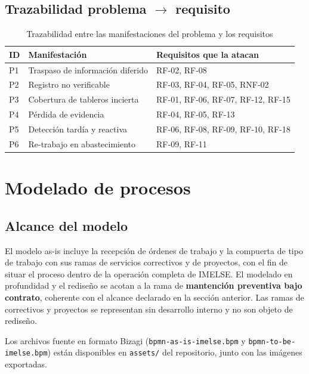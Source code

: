 \documentclass[10pt,letterpaper]{article}
\begin{document}
\subsection{Trazabilidad problema $\rightarrow$ requisito}

\begin{table}[H]
\centering
\small
\begin{tabular}{@{}p{1.2cm}p{6.3cm}p{6.8cm}@{}}
\toprule
\textbf{ID} & \textbf{Manifestación} & \textbf{Requisitos que la atacan} \\
\midrule
P1 & Traspaso de información diferido & RF-02, RF-08 \\
P2 & Registro no verificable & RF-03, RF-04, RF-05, RNF-02 \\
P3 & Cobertura de tableros incierta & RF-01, RF-06, RF-07, RF-12, RF-15 \\
P4 & Pérdida de evidencia & RF-04, RF-05, RF-13 \\
P5 & Detección tardía y reactiva & RF-06, RF-08, RF-09, RF-10, RF-18 \\
P6 & Re-trabajo en abastecimiento & RF-09, RF-11 \\
\bottomrule
\end{tabular}
\caption{Trazabilidad entre las manifestaciones del problema y los requisitos}
\end{table}

\section{Modelado de procesos}

\subsection{Alcance del modelo}

El modelo as-is incluye la recepción de órdenes de trabajo y la compuerta de tipo de
trabajo con sus ramas de servicios correctivos y de proyectos, con el fin de situar el
proceso dentro de la operación completa de IMELSE. El modelado en profundidad y el
rediseño se acotan a la rama de \textbf{mantención preventiva bajo contrato},
coherente con el alcance declarado en la sección anterior. Las ramas de correctivos y
proyectos se representan sin desarrollo interno y no son objeto de rediseño.

Los archivos fuente en formato Bizagi (\texttt{bpmn-as-is-imelse.bpm} y
\texttt{bpmn-to-be-imelse.bpm}) están disponibles en \texttt{assets/} del repositorio,
junto con las imágenes exportadas.
\end{document}
